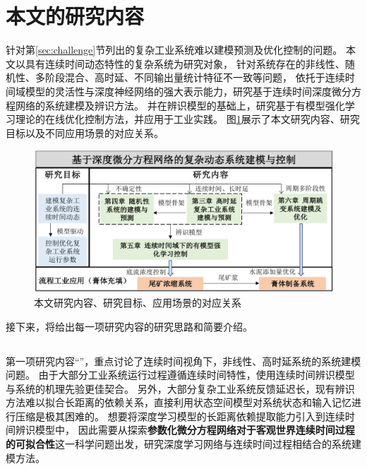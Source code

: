 \section{本文的研究内容}
针对第\ref{sec:challenge}节列出的复杂工业系统难以建模预测及优化控制的问题。
本文以具有连续时间动态特性的复杂系统为研究对象，
针对系统存在的非线性、随机性、多阶段混合、高时延、不同输出量统计特征不一致等问题，
依托于连续时间域模型的灵活性与深度神经网络的强大表示能力，研究基于连续时间深度微分方程网络的系统建模及辨识方法。
并在辨识模型的基础上，研究基于有模型强化学习理论的在线优化控制方法，并应用于工业实践。
图\ref{fig:study_goal}展示了本文研究内容、研究目标以及不同应用场景的对应关系。
\begin{figure}[h]
    \includegraphics[width=\linewidth]{figures/chapter1/study_goal.pdf}
    \caption{本文研究内容、研究目标、应用场景的对应关系}
    \label{fig:study_goal}
\end{figure}
接下来，将给出每一项研究内容的研究思路和简要介绍。

\subsection{\TitlechapterI}
第一项研究内容“\TitlechapterI”，重点讨论了连续时间视角下，非线性、高时延系统的系统建模问题。
由于大部分工业系统运行过程遵循连续时间特性，使用连续时间辨识模型与系统的机理先验更佳契合。
另外，大部分复杂工业系统反馈延迟长，现有辨识方法难以拟合长距离的依赖关系，直接利用状态空间模型对系统状态和输入记忆进行压缩是极其困难的。
想要将深度学习模型的长距离依赖提取能力引入到连续时间辨识模型中，
因此需要从探索\textbf{参数化微分方程网络对于客观世界连续时间过程的可拟合性}这一科学问题出发，研究深度学习网络与连续时间过程相结合的系统建模方法。

